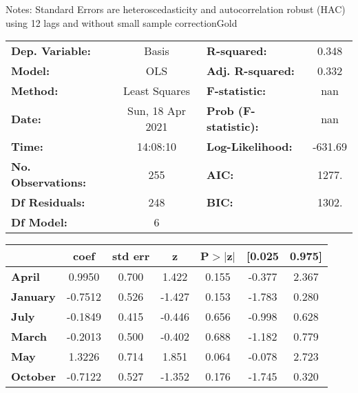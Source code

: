 Notes: \newline
 [1] Standard Errors are heteroscedasticity and autocorrelation robust (HAC) using 12 lags and without small sample correctionGold\begin{center}
\begin{tabular}{lclc}
\toprule
\textbf{Dep. Variable:}    &      Basis       & \textbf{  R-squared:         } &     0.348   \\
\textbf{Model:}            &       OLS        & \textbf{  Adj. R-squared:    } &     0.332   \\
\textbf{Method:}           &  Least Squares   & \textbf{  F-statistic:       } &       nan   \\
\textbf{Date:}             & Sun, 18 Apr 2021 & \textbf{  Prob (F-statistic):} &      nan    \\
\textbf{Time:}             &     14:08:10     & \textbf{  Log-Likelihood:    } &   -631.69   \\
\textbf{No. Observations:} &         255      & \textbf{  AIC:               } &     1277.   \\
\textbf{Df Residuals:}     &         248      & \textbf{  BIC:               } &     1302.   \\
\textbf{Df Model:}         &           6      & \textbf{                     } &             \\
\bottomrule
\end{tabular}
\begin{tabular}{lcccccc}
                 & \textbf{coef} & \textbf{std err} & \textbf{z} & \textbf{P$> |$z$|$} & \textbf{[0.025} & \textbf{0.975]}  \\
\midrule
\textbf{April}   &       0.9950  &        0.700     &     1.422  &         0.155        &       -0.377    &        2.367     \\
\textbf{January} &      -0.7512  &        0.526     &    -1.427  &         0.153        &       -1.783    &        0.280     \\
\textbf{July}    &      -0.1849  &        0.415     &    -0.446  &         0.656        &       -0.998    &        0.628     \\
\textbf{March}   &      -0.2013  &        0.500     &    -0.402  &         0.688        &       -1.182    &        0.779     \\
\textbf{May}     &       1.3226  &        0.714     &     1.851  &         0.064        &       -0.078    &        2.723     \\
\textbf{October} &      -0.7122  &        0.527     &    -1.352  &         0.176        &       -1.745    &        0.320     \\

\end{tabular}
\end{center}
